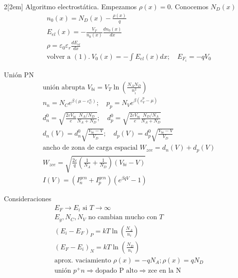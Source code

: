 \documentclass[leqno]{article}
\begin{document}
\begin{multicols}{2}[\columnsep2em]
Algoritmo electrostática. Empezamos $\rho (x)=0$. Conocemos $N_D(x)$
\begin{align}
  & n_0(x) = N_D(x)- \frac{\rho (x)}{q} \\
  & E_{el}(x) = - \frac{V_T}{n_0(x)} \frac{dn_0(x)}{dx}\\
  & \rho = \varepsilon _0\varepsilon _r \frac{dE_{el}}{dx}\\
  & \text{volver a } (1).\ V_0(x) = -\int E_{el}(x)dx; \quad E_{F_i} = -qV_0
\end{align}



Unión PN
\begin{align*}
  & \text{unión abrupta } V_{bi} = V_T \ln \left(  \frac{N_AN_D}{n_i^2} \right) \\
  &n_n = N_C e ^{\beta (\mu -\varepsilon _C^n)}; \quad p_p = N_V e ^{\beta (\varepsilon _V^p-\mu )}\\
  &d^0_n = \sqrt{ \frac{2\varepsilon V_{bi}}{e} \frac{N_A / N_D}{N_A+N_D}}; \quad d_p^0 = \sqrt{\frac{2\varepsilon V_{bi}}{e}\frac{N_D / N_A}{N_A+N_D}} \\
  & d_n(V) = d_n^0 \sqrt{\frac{V_{bi}-V}{V_D}}; \quad d_p(V) = d_p^0 \sqrt{\frac{V_{bi}-V}{V_D}}\\
  &\text{ancho de zona de carga espacial } W_{zce} = d_n(V)+d_p(V)\\
  & W_{zce} = \sqrt{ \frac{2\varepsilon }{q} \left( \frac{1}{N_A} + \frac{1}{N_D} \right)(V_{bi}-V) } \\
  & I(V) = (I_n ^{gen} +I_p ^{gen})(e ^{\beta qV}-1)
\end{align*}

Consideraciones
\begin{align*}
  & E_F \to E_i \text{ si } T \to \infty \\
  & E_g, N_C, N_V \text{ no cambian mucho con } T\\
  & (E_i-E_F)_P = kT \ln\left( \frac{N_A}{n_i} \right) \\
  & (E_F - E_i)_N = kT \ln \left( \frac{N_D}{n_i} \right) \\
  & \text{aprox. vaciamiento } \rho (x) = -qN_A; \rho (x)=qN_D\\
  & \text{unión } p^+n \Rightarrow \text{dopado P alto} \Rightarrow \text{zce en la N}
\end{align*}












\end{multicols}
\end{document}
